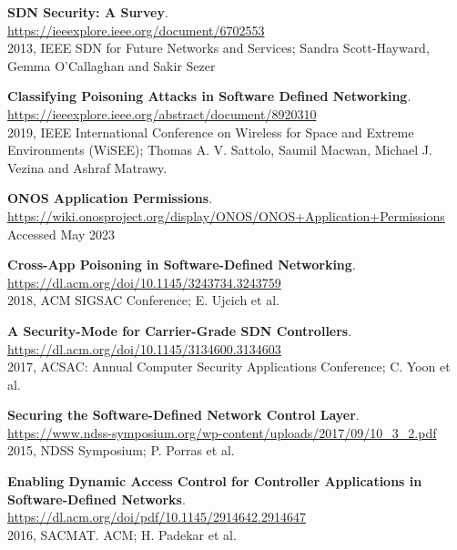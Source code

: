 \documentclass[a4paper,10pt]{memoir}
\begin{document}
{\begin{thebibliography}{9}
  \textbf{SDN Security: A Survey}.\\
  \href{https://ieeexplore.ieee.org/document/6702553}{https://ieeexplore.ieee.org/document/6702553}\\
  2013, IEEE SDN for Future Networks and Services; Sandra Scott-Hayward, Gemma O’Callaghan and Sakir Sezer

  \textbf{Classifying Poisoning Attacks in Software Defined Networking}.\\
  \href{https://ieeexplore.ieee.org/abstract/document/8920310}{https://ieeexplore.ieee.org/abstract/document/8920310}\\
  2019, IEEE International Conference on Wireless for Space and Extreme Environments (WiSEE); Thomas A. V. Sattolo, Saumil Macwan, Michael J. Vezina and Ashraf Matrawy.
 
  \textbf{ONOS Application Permissions}.\\
  \href{https://wiki.onosproject.org/display/ONOS/ONOS+Application+Permissions}{https://wiki.onosproject.org/display/ONOS/ONOS+Application+Permissions}\\
  Accessed May 2023

  \textbf{Cross-App Poisoning in Software-Defined Networking}.\\
  \href{https://dl.acm.org/doi/10.1145/3243734.3243759}{https://dl.acm.org/doi/10.1145/3243734.3243759}\\
  2018, ACM SIGSAC Conference; E. Ujcich et al.

  \textbf{A Security-Mode for Carrier-Grade SDN Controllers}.\\
  \href{https://dl.acm.org/doi/10.1145/3134600.3134603}{https://dl.acm.org/doi/10.1145/3134600.3134603}\\
  2017, ACSAC: Annual Computer Security Applications Conference; C. Yoon et al.

  \textbf{Securing the Software-Defined Network Control Layer}.\\
  \href{https://www.ndss-symposium.org/wp-content/uploads/2017/09/10_3_2.pdf}{https://www.ndss-symposium.org/wp-content/uploads/2017/09/10\_3\_2.pdf}\\
  2015, NDSS Symposium; P. Porras et al.

  \textbf{Enabling Dynamic Access Control for Controller Applications in Software-Defined Networks}.\\
  \href{https://dl.acm.org/doi/pdf/10.1145/2914642.2914647}{https://dl.acm.org/doi/pdf/10.1145/2914642.2914647}\\
  2016, SACMAT. ACM; H. Padekar et al.


\end{thebibliography}}
\end{document}
